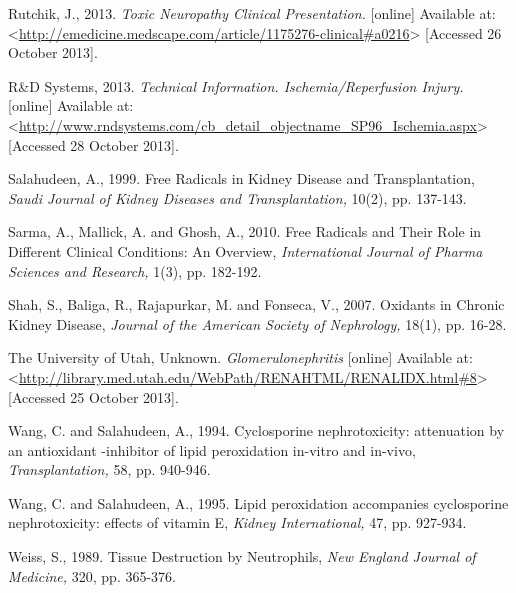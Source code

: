 \documentclass[12pt]{report}
\begin{document}
Rutchik, J., 2013. \textit{Toxic Neuropathy Clinical Presentation.} [online] Available at: <\url{http://emedicine.medscape.com/article/1175276-clinical#a0216}> [Accessed 26 October 2013].
\newline
\newline

R\&D Systems, 2013. \textit{Technical Information. Ischemia/Reperfusion Injury.} [online] Available at: <\url{http://www.rndsystems.com/cb_detail_objectname_SP96_Ischemia.aspx}> [Accessed 28 October 2013].
\newline
\newline

Salahudeen, A., 1999. Free Radicals in Kidney Disease and Transplantation, \textit{Saudi Journal of Kidney Diseases and Transplantation,} 10(2), pp. 137-143.
\newline
\newline

Sarma, A., Mallick, A. and Ghosh, A., 2010. Free Radicals and Their Role in Different Clinical Conditions: An Overview, \textit{International Journal of Pharma Sciences and Research,} 1(3), pp. 182-192.
\newline
\newline

Shah, S., Baliga, R., Rajapurkar, M. and Fonseca, V., 2007. Oxidants in Chronic Kidney Disease, \textit{Journal of the American Society of Nephrology,} 18(1), pp. 16-28.
\newline
\newline

The University of Utah, Unknown. \textit{Glomerulonephritis} [online] Available at: <\url{http://library.med.utah.edu/WebPath/RENAHTML/RENALIDX.html#8}> [Accessed 25 October 2013].
\newline
\newline

Wang, C. and Salahudeen, A., 1994. Cyclosporine nephrotoxicity: attenuation by an antioxidant -inhibitor of lipid peroxidation in-vitro and in-vivo, \textit{Transplantation,} 58, pp. 940-946.
\newline
\newline

Wang, C. and Salahudeen, A., 1995. Lipid peroxidation accompanies cyclosporine nephrotoxicity: effects of vitamin E, \textit{Kidney International,} 47, pp. 927-934.
\newline
\newline

Weiss, S., 1989. Tissue Destruction by Neutrophils, \textit{New England Journal of Medicine,} 320, pp. 365-376.
\newline
\newline
\end{document}
